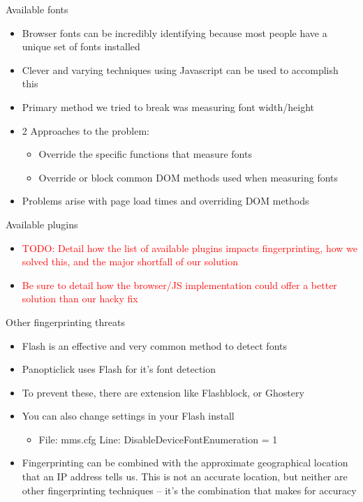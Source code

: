 \begin{frame}[fragile,t]{Available fonts}
	\begin{itemize}
		\item Browser fonts can be incredibly identifying because most people have a unique set of fonts installed
		\item Clever and varying techniques using Javascript can be used to accomplish this
		\item Primary method we tried to break was measuring font width/height
		\item 2 Approaches to the problem:
			\begin{itemize}
				\item Override the specific functions that measure fonts
				\item Override or block common DOM methods used when measuring fonts
			\end{itemize}
		\item Problems arise with page load times and overriding DOM methods	
	\end{itemize}
\end{frame}

\begin{frame}[fragile,t]{Available plugins}
	\begin{itemize}
		\item \textcolor{red}{TODO: Detail how the list of available plugins impacts fingerprinting, how we solved this, and the major shortfall of our solution}
		\item \textcolor{red}{Be sure to detail how the browser/JS implementation could offer a better solution than our hacky fix}
	\end{itemize}
\end{frame}

\begin{frame}[fragile,t]{Other fingerprinting threats}
	\begin{itemize}
		\item Flash is an effective and very common method to detect fonts
		\item Panopticlick uses Flash for it's font detection
		\item To prevent these, there are extension like Flashblock, or Ghostery
		\item You can also change settings in your Flash install
		\begin{itemize}
			\item File: mms.cfg Line: DisableDeviceFontEnumeration = 1
		\end{itemize}
		\item Fingerprinting can be combined with the approximate geographical location that an IP address tells us. This is not an accurate location, but neither are other fingerprinting techniques -- it's the combination that makes for accuracy
	\end{itemize}
\end{frame}


